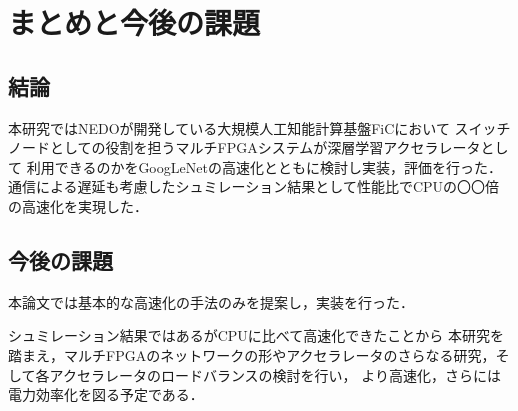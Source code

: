 \chapter{まとめと今後の課題}
{
\label{chap:conclusion}
\section{結論}
\label{sec:conclusion}
本研究ではNEDOが開発している大規模人工知能計算基盤FiCにおいて
スイッチノードとしての役割を担うマルチFPGAシステムが深層学習アクセラレータとして
利用できるのかをGoogLeNetの高速化とともに検討し実装，評価を行った．
通信による遅延も考慮したシュミレーション結果として性能比でCPUの〇〇倍の高速化を実現した．

\section{今後の課題}
\label{sec:future}
本論文では基本的な高速化の手法のみを提案し，実装を行った．

シュミレーション結果ではあるがCPUに比べて高速化できたことから
本研究を踏まえ，マルチFPGAのネットワークの形やアクセラレータのさらなる研究，そして各アクセラレータのロードバランスの検討を行い，
より高速化，さらには電力効率化を図る予定である．
}
